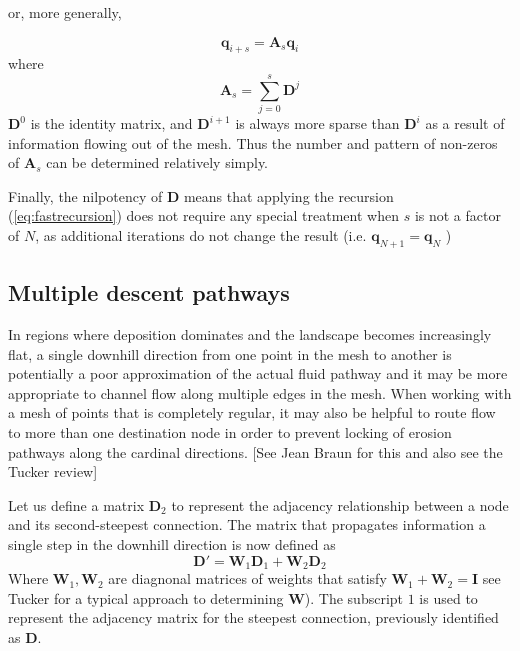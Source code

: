 \documentclass[draft,jgrga]{agu_template/AGUTeX}
\begin{document}
or, more generally, 

\begin{equation}
    \bm{q}_{i+s} = \bm{A}_s \bm{q}_i
    \label{eq:fastrecursion}
\end{equation}  
where 
\begin{equation}
    \bm{A}_s = \sum_{j=0}^{s} \bm{D}^j 
\end{equation}
$\bm{D}^0$ is the identity matrix, and $\bm{D}^{i+1}$ is always more sparse than $\bm{D}^i$ as a result of information flowing out of the mesh. Thus the number and pattern of non-zeros of $\bm{A}_s$ can be determined relatively simply. 

Finally, the nilpotency of $\bm{D}$ means that applying the recursion (\ref{eq:fastrecursion}) does not require any special treatment when $s$ is not a factor of $N$, as additional iterations do not change the result (i.e. $\bm{q}_{N+1} = \bm{q}_{N}$ )


\subsection{Multiple descent pathways}

In regions where deposition dominates and the landscape becomes increasingly flat, a single downhill direction from one point in the mesh to another is potentially a poor approximation of the actual fluid pathway and it may be more appropriate to channel flow along multiple edges in the mesh. When working with a mesh of points that is completely regular, it may also be helpful to route flow to more than one destination node in order to prevent locking of erosion pathways along the cardinal directions. [See Jean Braun for this and also see the Tucker review]

Let us define a matrix $\bm{D}_2$ to represent the adjacency relationship between a node and its second-steepest connection. The matrix that propagates information a single step in the downhill direction is now defined as
\begin{equation}
    \bm{D'} =  \bm{W}_1  \bm{D}_1 + 
                  \bm{W}_2  \bm{D}_2 
\end{equation}
Where $\bm{W}_{1}, \bm{W}_{2}$ are diagnonal matrices of weights that satisfy $ \bm{W}_1 +  \bm{W}_2 =  \bm{I}$ see Tucker for a typical approach to determining $\bm{W}$). The subscript $1$ is used to represent the adjacency matrix for the steepest connection, previously identified as $\bm{D}$.
\end{document}
